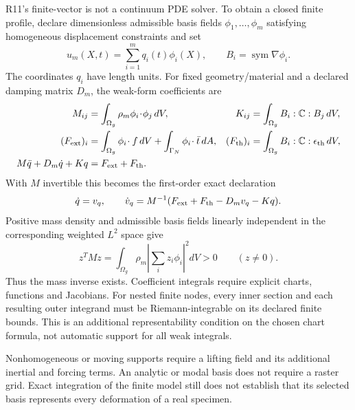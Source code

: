 R11's finite-vector  is not a continuum PDE solver. To obtain a
closed finite profile, declare dimensionless admissible basis fields
$\phi_1,\ldots,\phi_m$ satisfying homogeneous displacement constraints and set
\begin{equation}
 u_m(X,t)=\sum_{i=1}^m q_i(t)\phi_i(X),\qquad
 B_i=\operatorname{sym}\nabla\phi_i .
\end{equation}
The coordinates $q_i$ have length units. For fixed geometry/material and a
declared damping matrix $D_m$, the weak-form coefficients are
\begin{align}
 M_{ij}&=\int_{\Omega_g}\rho_m\phi_i\!\cdot\!\phi_j\,dV,
 &K_{ij}&=\int_{\Omega_g}B_i:\mathbb C:B_j\,dV,\\
 (F_{\rm ext})_i&=\int_{\Omega_g}\phi_i\!\cdot f\,dV
                  +\int_{\Gamma_N}\phi_i\!\cdot\bar t\,dA,
 &(F_{\rm th})_i&=\int_{\Omega_g}B_i:\mathbb C:\epsilon_{\rm th}\,dV,\\
 M\ddot q+D_m\dot q+Kq&=F_{\rm ext}+F_{\rm th}.&&
\end{align}
With $M$ invertible this becomes the first-order exact declaration
\begin{equation}
 \dot q=v_q,\qquad
 \dot v_q=M^{-1}(F_{\rm ext}+F_{\rm th}-D_mv_q-Kq).
\end{equation}
Positive mass density and admissible basis fields linearly independent in the
corresponding weighted $L^2$ space give
\begin{equation}
 z^TMz=\int_{\Omega_g}\rho_m\left|\sum_i z_i\phi_i\right|^2dV>0
 \qquad(z\ne0).
\end{equation}
Thus the mass inverse exists. Coefficient integrals require explicit charts,
functions and Jacobians. For nested finite  nodes, every inner
section and each resulting outer integrand must be Riemann-integrable on
its declared finite bounds. This is an additional representability condition
on the chosen chart formula, not automatic support for all weak integrals.

Nonhomogeneous or moving supports require a lifting field and its additional
inertial and forcing terms. An analytic or modal basis does not require a
raster grid. Exact integration of the finite model still does not establish
that its selected basis represents every deformation of a real specimen.

